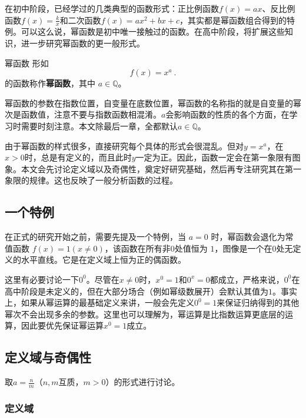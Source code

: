 

在初中阶段，已经学过的几类典型的函数形式：正比例函数$f(x) = ax$、反比例函数$\displaystyle f(x) = \frac{k}{x}$和二次函数$f(x) = ax^2+bx+c$，其实都是幂函数组合得到的特例。可以这么说，幂函数是初中唯一接触过的函数。在高中阶段，将扩展这些知识，进一步研究幂函数的更一般形式。

\begin{definition}{幂函数}
形如
\begin{equation}
f(x) = x^a~.
\end{equation}
的函数称作\textbf{幂函数}，其中 $a\in\mathbb Q$。
\end{definition}
幂函数的参数在指数位置，自变量在底数位置，幂函数的名称指的就是自变量的幂次是函数值，注意不要与指数函数相混淆。$a$会影响函数的性质的各个方面，在学习时需要时刻注意。本文除最后一章，全都默认$a\in\mathbb Q$。

由于幂函数的样式很多，直接研究每个具体的形式会很混乱。但对$y=x^a$，在$x>0$时，总是有定义的，而且此时$y$一定为正。因此，函数一定会在第一象限有图象。本文会先讨论定义域以及奇偶性，奠定好研究基础，然后再专注研究其在第一象限的规律。这也反映了一般分析函数的过程。

\subsection{一个特例}

在正式的研究开始之前，需要先提及一个特例，当 $a = 0$ 时，幂函数会退化为常值函数 $f(x) = 1(x\neq0)$，该函数在所有非$0$处值恒为 $1$，图像是一个在$0$处无定义的水平直线。它是在定义域上恒为正的偶函数。

这里有必要讨论一下$0^0$。尽管在$x\neq0$时，$x^0=1$和$0^x=0$都成立，严格来说，$0^0$在高中阶段是未定义的，但在大部分场合（例如幂级数展开）会默认其值为$1$。事实上，如果从幂运算的最基础定义来讲，一般会先定义$0^0=1$来保证归纳得到的其他幂次不会出现多余的参数。这里也可以理解为，幂运算是比指数运算更底层的运算，因此要优先保证幂运算$x^0=1$成立。

\subsection{定义域与奇偶性}

取$\displaystyle a=\frac{n}{m}$（$n,m$互质，$m>0$）的形式进行讨论。

\subsubsection{定义域}

